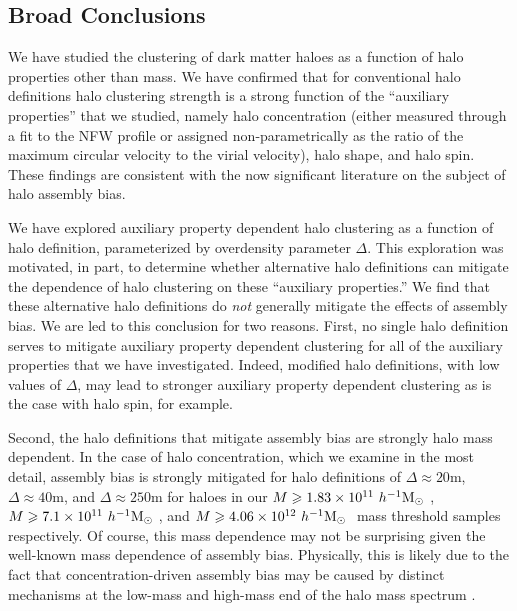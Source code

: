 \documentclass[usenatbib,fleqn]{mnras}
\begin{document}
\subsection{Broad Conclusions}

We have studied the clustering of dark matter haloes as a function of halo properties other than mass. We have confirmed that for conventional halo definitions halo clustering strength is a strong function of the  ``auxiliary properties'' that we studied, namely halo concentration (either measured through a fit to the NFW profile or assigned non-parametrically as the ratio of the maximum circular velocity to the virial velocity), halo shape, and halo spin. These findings are consistent with the now significant literature on the subject of halo assembly bias. \citep{peacock_smith00, wechsler_etal02,sheth_tormen04, gao_etal05, zentner_etal05, allgood_etal06, harker_etal06, wechsler_etal06, croton_etal07, zentner07, dalal_etal08, zentner_etal14, mao_etal15, sunayama_etal16}

We have explored auxiliary property dependent halo clustering as a function of halo definition, parameterized by overdensity parameter $\Delta$. This exploration was motivated, in part, to determine whether alternative halo definitions can mitigate the dependence of halo clustering on these ``auxiliary properties.'' We find that these alternative halo definitions do {\em not} generally mitigate the effects of assembly bias. We are led to this conclusion for two reasons. First, no single halo definition serves to mitigate auxiliary property dependent clustering for all of the auxiliary properties that we have investigated. Indeed, modified halo definitions, with low values of $\Delta$, may lead to stronger auxiliary property dependent clustering as is the case with halo spin, for example.

Second, the halo definitions that mitigate assembly bias are strongly halo mass dependent. In the case of halo concentration, which we examine in the most detail, assembly bias is strongly mitigated for halo definitions of $\Delta \approx 20$m, $\Delta \approx 40$m, and $\Delta \approx 250$m for haloes in our $M \geqslant 1.83 \times 10^{11} \ h^{-1}\mathrm{M}_{\odot}~$, $M \geqslant 7.1 \times 10^{11} \ h^{-1}\mathrm{M}_{\odot}~$, and $M \geqslant 4.06 \times 10^{12} \ h^{-1}\mathrm{M}_{\odot}~$ mass threshold samples respectively. Of course, this mass dependence may not be surprising given the well-known mass dependence of assembly bias. Physically, this is likely due to the fact that concentration-driven assembly bias may be caused by distinct mechanisms at the low-mass and high-mass end of the halo mass spectrum \citep[e.g., see][]{zentner07,wang_etal07,dalal_etal08}. 
\end{document}
